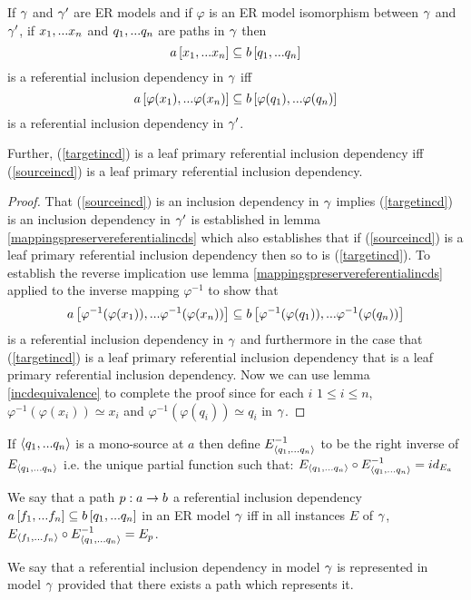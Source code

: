 \begin{lemma}
If $\gamma$ and $\gamma'$ are ER models and  if  $\varphi$ is an ER model isomorphism between $\gamma$  and $\gamma'$,  
if $x_1,...x_n$ and $q_1,...q_n$ are paths in 
$\gamma$
then 
\begin{equation}
\label{sourceincd}
a\left[x_1,...x_n\right]\subseteq b\left[q_1,...q_n\right]
\end{equation}
is a referential inclusion dependency in $\gamma$ 
iff 
\begin{equation}
\label{targetincd}
a\left[\varphi(x_1),...\varphi(x_n)\right]\subseteq b\left[\varphi(q_1),...\varphi(q_n)\right]
\end{equation}
is a referential inclusion dependency in $\gamma'$. 

Further, (\ref{targetincd}) is a leaf primary referential inclusion dependency  iff (\ref{sourceincd}) is a leaf primary referential inclusion dependency.
\end{lemma}
\begin{proof}
That (\ref{sourceincd}) is an inclusion dependency in $\gamma$ implies 
(\ref{targetincd}) is an inclusion dependency in $\gamma'$ is established in lemma
\ref{mappingspreservereferentialincds} which also
establishes that if (\ref{sourceincd}) is a leaf primary referential inclusion dependency
then so to is (\ref{targetincd}). To establish the reverse implication use lemma
\ref{mappingspreservereferentialincds} applied to the inverse mapping $\varphi^{-1}$
to show that
\begin{equation}
a\left[\varphi^{-1}(\varphi(x_1)),...\varphi^{-1}(\varphi(x_n))\right]\subseteq b\left[\varphi^{-1}(\varphi(q_1)),...\varphi^{-1}(\varphi(q_n))\right]
\end{equation}
is a referential inclusion dependency in $\gamma$  and furthermore in the case that
(\ref{targetincd}) is a leaf primary referential inclusion dependency that is
a leaf primary referential inclusion dependency.
Now we can use lemma
\ref{incdequivalence} to complete the proof since for each  $i$ $ 1 \leq i \leq n$, $\varphi^{-1}(\varphi(x_i)) \simeq x_i$ and $\varphi^{-1}(\varphi(q_i))\simeq q_i$ in $\gamma$. 
\end{proof}

If $\langle q_1,...q_n\rangle$ is a mono-source at $a$ then define $E_{\langle q_1,...q_n\rangle}^{-1}$ to be the right inverse of
$E_{\langle q_1,...q_n\rangle}$ i.e. the unique partial function such that:
$E_{\langle q_1,...q_n\rangle} \circ E_{\langle q_1,...q_n\rangle}^{-1} = id_{E_a}$

\begin{definition}
We say that a path $p:a \rightarrow b$  a referential inclusion dependency
$a\left[f_1,...f_n\right]\subseteq b\left[q_1,...q_n\right]$  in an ER model $\gamma$ iff
  in all instances $E$ of $\gamma$, $E_{\langle f_1,...f_n\rangle} \circ E_{\langle q_1,...q_n\rangle}^{-1}=E_p$.
\end{definition}
We say that a referential inclusion dependency in model $\gamma$ is represented in model $\gamma$ provided that there exists a path which represents it. 

